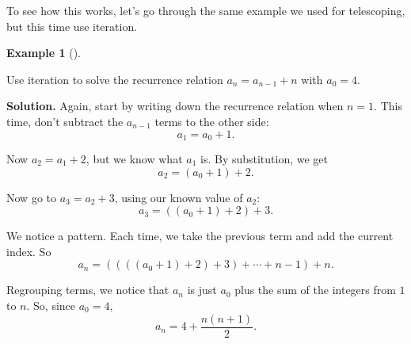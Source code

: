 \documentclass[10pt,]{book}
\theoremstyle{plain}
\theoremstyle{definition}
\newtheorem{example}[theorem]{Example}
\theoremstyle{definition}
\theoremstyle{definition}
\numberwithin{equation}{chapter}
\begin{document}
To see how this works, let's go through the same example we used for telescoping, but this time use iteration.
%
\begin{example}[]\label{example-75}

Use iteration to solve the recurrence relation \(a_n = a_{n-1} + n\) with \(a_0 = 4\).
%
\par\medskip\noindent%
\textbf{Solution.}\quad
Again, start by writing down the recurrence relation when \(n = 1\). This time, don't subtract the \(a_{n-1}\) terms to the other side:
\begin{equation*}
  a_1 = a_0 + 1.
\end{equation*}
%
\par

Now \(a_2 = a_1 + 2\), but we know what \(a_1\) is. By substitution, we get
\begin{equation*}
  a_2 = (a_0 + 1) + 2.
\end{equation*}
%
\par

Now go to \(a_3 = a_2 + 3\), using our known value of \(a_2\):
\begin{equation*}
  a_3 = ((a_0 + 1) + 2) + 3.
\end{equation*}
%
\par

We notice a pattern. Each time, we take the previous term and add the current index. So
\begin{equation*}
  a_n = ((((a_0 + 1) +2)+3)+\cdots + n-1) + n.
\end{equation*}
%
\par

Regrouping terms, we notice that \(a_n\) is just \(a_0\) plus the sum of the integers from \(1\) to \(n\). So, since \(a_0 = 4\),
\begin{equation*}
  a_n = 4 + \frac{n(n+1)}{2}.
\end{equation*}
%
\end{example}
\par
\end{document}
